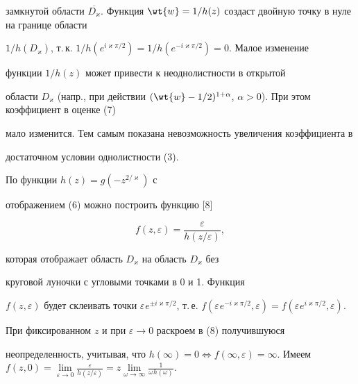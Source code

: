 замкнутой области $\overline {D_{\varkappa}}$. Функция $\wt {w}=


1/h(z)$ создаст двойную точку в нуле на границе области 


$1/h({D_{\varkappa}} )$, т.\,к. $1/h({e^{i\varkappa \pi /2}})=


1/h({e^{- i\varkappa \pi /2}})=0$. Малое изменение 


функции $1/h(z)$ может привести к неоднолистности в открытой 


области $D_{\varkappa}$ (напр., при действии $({\wt {w}-1/2} 


)^{1+\alpha}$, $\alpha > 0$). При этом коэффициент в оценке (7) 


мало изменится. Тем самым показана невозможность увеличения коэффициента в 


достаточном условии однолистности (3).





По функции $h(z)=g({- z^{2/\varkappa}})$ с 


отображением (6) можно построить функцию [8]


\begin{equation}


f({z,\varepsilon} )=\frac{{\varepsilon}}{{h(


{z/\varepsilon} )}},


\end{equation}


которая отображает область $D_{\varkappa}$ на область $D_{\varkappa}$ без 


круговой луночки с угловыми точками в 0 и 1. Функция 


$f({z,\varepsilon} )$ будет склеивать точки $\varepsilon^{}e^{\pm 


i\varkappa \pi /2}$, т.\,е. $f({\varepsilon^{}e^{- i\varkappa \pi 


/2},\varepsilon} )=f({\varepsilon^{}e^{i\varkappa \pi 


/2},\varepsilon} )$.





При фиксированном $z$ и при $\varepsilon \to 0$ раскроем в (8) получившуюся 


неопределенность, учитывая, что $h({\infty} )=0 \Leftrightarrow 


f({\infty,\varepsilon} )=\infty $. Имеем $f({z,0})=


\lim\limits_{\varepsilon \to 0} \frac{{\varepsilon 


}}{{h({z/\varepsilon} )}}=z\lim\limits_{\omega \to 


\infty} \frac{1}{{\omega^{}h({\omega} )}}$.






